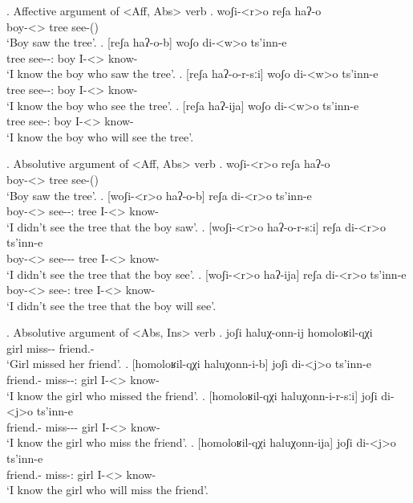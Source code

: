 \ex. Affective argument of <Aff, Abs> verb
	\ag. woʃi-<r>o reʃa haʔ-o\\
			{boy-<\Nans>\Aff} tree {see-\Pst(\Aor)}\\
			\glt `Boy saw the tree'.
	\bg. [reʃa haʔ-o-b] woʃo di-<w>o ts'inn-e\\
			tree {see-\Pst-\Ptcp:\Pst} boy {I-<\M>\Aff} {know-\Hab}\\
			\glt `I know the boy who saw the tree'.
	\bg. [reʃa haʔ-o-r-sːi] woʃo di-<w>o ts'inn-e\\
			tree {see-\Pst-\Ptcp:\Pst} boy {I-<\M>\Aff} {know-\Hab}\\
			\glt `I know the boy who see the tree'.
	\bg. [reʃa haʔ-ija] woʃo di-<w>o ts'inn-e\\
			tree {see-\Ptcp:\Fut} boy {I-<\M>\Aff} {know-\Hab}\\
			\glt `I know the boy who will see the tree'.

\ex. Absolutive argument of <Aff, Abs> verb
	\ag. woʃi-<r>o reʃa haʔ-o\\
			{boy-<\Nans>\Aff} tree {see-\Pst(\Aor)}\\
			\glt `Boy saw the tree'.
	\bg. [woʃi-<r>o haʔ-o-b] reʃa di-<r>o ts'inn-e\\
			{boy-<\Nans>\Aff} {see-\Pst-\Ptcp:\Pst} tree {I-<\Nans>\Aff} {know-\Hab}\\
			\glt `I didn't see the tree that the boy saw'.
	\bg. [woʃi-<r>o haʔ-o-r-sːi] reʃa di-<r>o ts'inn-e\\
			{boy-<\Nans>\Aff} {see-\Pst-\Prog-\Attr} tree {I-<\Nans>\Aff} {know-\Hab}\\
			\glt `I didn't see the tree that the boy see'.
	\bg. [woʃi-<r>o haʔ-ija] reʃa di-<r>o ts'inn-e\\
			{boy-<\Nans>\Aff} {see-\Ptcp:\Fut} tree {I-<\Nans>\Aff} {know-\Hab}\\
			\glt `I didn't see the tree that the boy will see'.

\ex. Absolutive argument of <Abs, Ins> verb
	\ag. joʃi haluχ-onn-ij homoloʁil-qχi\\
			{girl} {miss-\Pst-\Pf} {friend.\Obl-\Inst}\\
			\glt `Girl missed her friend'.
	\bg. [homoloʁil-qχi haluχonn-i-b] joʃi di-<j>o ts'inn-e\\
			{friend.\Obl-\Inst} {miss-\Pst-\Ptcp:\Pst} girl {I-<\M>\Aff} {know-\Hab}\\
			\glt `I know the girl who missed the friend'.
	\bg. [homoloʁil-qχi haluχonn-i-r-sːi] joʃi di-<j>o ts'inn-e\\
			{friend.\Obl-\Inst} {miss-\Pst-\Prog-\Attr} girl {I-<\M>\Aff} {know-\Hab}\\
			\glt `I know the girl who miss the friend'.
	\bg. [homoloʁil-qχi haluχonn-ija] joʃi di-<j>o ts'inn-e\\
			{friend.\Obl-\Inst} {miss-\Ptcp:\Fut} girl {I-<\M>\Aff} {know-\Hab}\\
			\glt `I know the girl who will miss the friend'.

